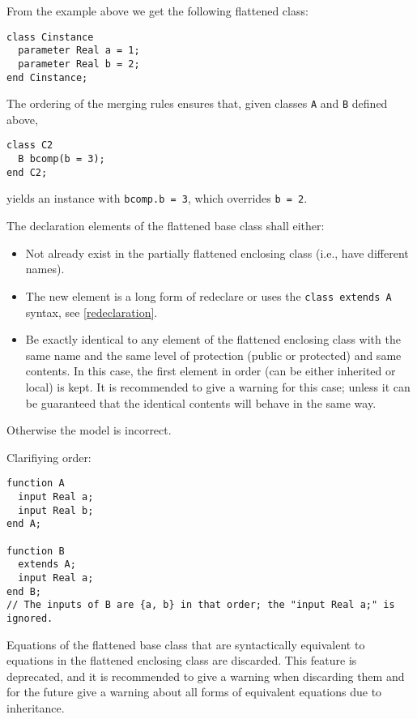 \begin{nonnormative}
From the example above we get the following flattened class:
\begin{lstlisting}[language=modelica]
class Cinstance
  parameter Real a = 1;
  parameter Real b = 2;
end Cinstance;
\end{lstlisting}

The ordering of the merging rules ensures that, given classes \lstinline!A! and \lstinline!B! defined above,
\begin{lstlisting}[language=modelica]
class C2
  B bcomp(b = 3);
end C2;
\end{lstlisting}
yields an instance with \lstinline!bcomp.b = 3!, which overrides \lstinline!b = 2!.
\end{nonnormative}

The declaration elements of the flattened base class shall either:
\begin{itemize}
\item
  Not already exist in the partially flattened enclosing class
  (i.e., have different names).
\item
  The new element is a long form of redeclare or uses the \lstinline!class extends A! syntax, see \cref{redeclaration}.
\item
  Be exactly identical to any element of the flattened enclosing class
  with the same name and the same level of protection (public or
  protected) and same contents. In this case, the first element in order
  (can be either inherited or local) is kept. It is recommended to give
  a warning for this case; unless it can be guaranteed that the
  identical contents will behave in the same way.
\end{itemize}

Otherwise the model is incorrect.

\begin{nonnormative}
Clarifiying order:
\begin{lstlisting}[language=modelica]
function A
  input Real a;
  input Real b;
end A;

function B
  extends A;
  input Real a;
end B;
// The inputs of B are {a, b} in that order; the "input Real a;" is ignored.
\end{lstlisting}
\end{nonnormative}

Equations of the flattened base class that are syntactically equivalent
to equations in the flattened enclosing class are discarded. This
feature is deprecated, and it is recommended to give a warning when
discarding them and for the future give a warning about all forms of
equivalent equations due to inheritance.

